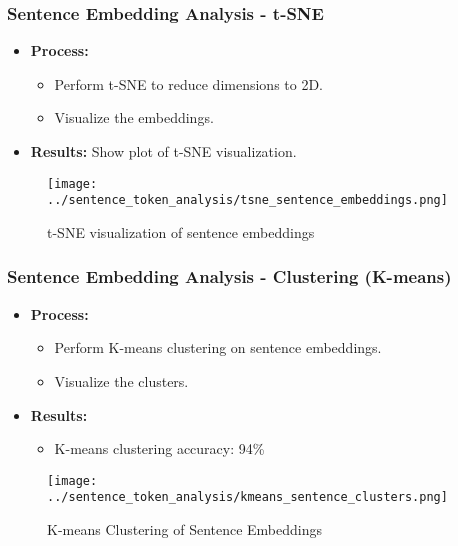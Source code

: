 \documentclass{beamer}
\begin{document}
\begin{frame}
\frametitle{Sentence Embedding Analysis - t-SNE}
\begin{itemize}
    \item \textbf{Process:}
    \begin{itemize}
        \item Perform t-SNE to reduce dimensions to 2D.
        \item Visualize the embeddings.
    \end{itemize}
    \item \textbf{Results:} Show plot of t-SNE visualization.
\end{itemize}
\begin{figure}[h]
    \centering
    \texttt{[image: ../sentence\_token\_analysis/tsne\_sentence\_embeddings.png]}
    \caption{t-SNE visualization of sentence embeddings}
\end{figure}
\end{frame}

\begin{frame}
\frametitle{Sentence Embedding Analysis - Clustering (K-means)}
\begin{itemize}
    \item \textbf{Process:}
    \begin{itemize}
        \item Perform K-means clustering on sentence embeddings.
        \item Visualize the clusters.
    \end{itemize}
    \item \textbf{Results:} 
    \begin{itemize}
        \item K-means clustering accuracy: 94\%
    \end{itemize}
\end{itemize}
\begin{figure}[h]
    \centering
    \texttt{[image: ../sentence\_token\_analysis/kmeans\_sentence\_clusters.png]}
    \caption{K-means Clustering of Sentence Embeddings}
\end{figure}
\end{frame}
\end{document}

